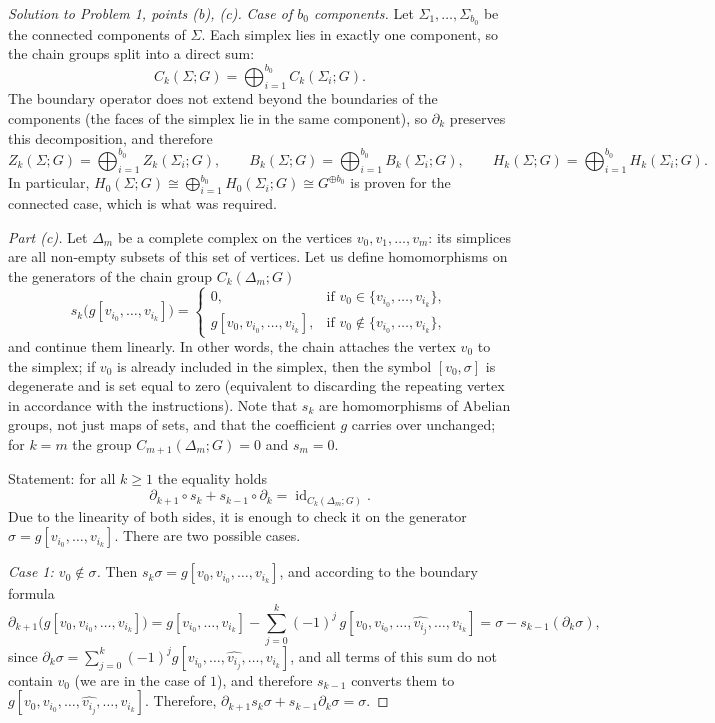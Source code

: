 \documentclass[a4paper,12pt]{report}
\begin{document}
\begin{proof}[Solution to Problem \textup{1}, points \textup{(b)}, \textup{(c)}]
\emph{Case of $b_0$ components.} Let $\Sigma_1,\dots,\Sigma_{b_0}$ be the connected components of $\Sigma$. Each simplex lies in exactly one component, so the chain groups split into a direct sum:
\[
C_k(\Sigma;G)=\bigoplus_{i=1}^{b_0}C_k(\Sigma_i;G).
\]
The boundary operator does not extend beyond the boundaries of the components \textup{(}the faces of the simplex lie in the same component\textup{)}, so $\partial_k$ preserves this decomposition, and therefore
\[
Z_k(\Sigma;G)=\bigoplus_{i=1}^{b_0}Z_k(\Sigma_i;G),\qquad B_k(\Sigma;G)=\bigoplus_{i=1}^{b_0}B_k(\Sigma_i;G),\qquad
H_k(\Sigma;G)=\bigoplus_{i=1}^{b_0}H_k(\Sigma_i;G).
\]
In particular, $H_0(\Sigma;G)\cong\bigoplus_{i=1}^{b_0}H_0(\Sigma_i;G)\cong G^{\oplus b_0}$ is proven for the connected case, which is what was required.

\textit{Part \textup{(c)}.} Let $\Delta_m$ be a complete complex on the vertices $v_0,v_1,\dots,v_m$\textup{:} its simplices are all non-empty subsets of this set of vertices. Let us define homomorphisms on the generators of the chain group $C_k(\Delta_m;G)$
\[
s_k\bigl(g[v_{i_0},\dots,v_{i_k}]\bigr)=
\begin{cases}
0, & \text{if } v_0\in\{v_{i_0},\dots,v_{i_k}\}, \\[1mm]
g[v_0,v_{i_0},\dots,v_{i_k}], & \text{if } v_0\notin\{v_{i_0},\dots,v_{i_k}\},
\end{cases}
\]
and continue them linearly. In other words, the chain attaches the vertex $v_0$ to the simplex; if $v_0$ is already included in the simplex, then the symbol $[v_0,\sigma]$ is degenerate and is set equal to zero \textup{(}equivalent to discarding the repeating vertex in accordance with the instructions\textup{)}. Note that $s_k$ are homomorphisms of Abelian groups, not just maps of sets, and that the coefficient $g$ carries over unchanged; for $k=m$ the group $C_{m+1}(\Delta_m;G)=0$ and $s_m=0$.

Statement: for all $k\ge1$ the equality holds
\[
\partial_{k+1}\circ s_k+s_{k-1}\circ\partial_k=\operatorname{id}_{C_k(\Delta_m;G)} .
\]
Due to the linearity of both sides, it is enough to check it on the generator $\sigma=g[v_{i_0},\dots,v_{i_k}]$. There are two possible cases.

\emph{Case \textup{1}\textup{:} $v_0\notin\sigma$.} Then $s_k\sigma=g[v_0,v_{i_0},\dots,v_{i_k}]$, and according to the boundary formula
\[
\partial_{k+1}\bigl(g[v_0,v_{i_0},\dots,v_{i_k}]\bigr)
=g[v_{i_0},\dots,v_{i_k}]-\sum_{j=0}^{k}(-1)^{j}\,g[v_0,v_{i_0},\dots,\widehat{v_{i_j}},\dots,v_{i_k}]
=\sigma-s_{k-1}(\partial_k\sigma),
\]
since $\partial_k\sigma=\sum_{j=0}^{k}(-1)^{j}g[v_{i_0},\dots,\widehat{v_{i_j}},\dots,v_{i_k}]$, and all terms of this sum do not contain $v_0$ \textup{(}we are in the case of $1$\textup{)}, and therefore $s_{k-1}$ converts them to $g[v_0,v_{i_0},\dots,\widehat{v_{i_j}},\dots,v_{i_k}]$. Therefore, $\partial_{k+1}s_k\sigma+s_{k-1}\partial_k\sigma=\sigma$.


\end{proof}
\end{document}
